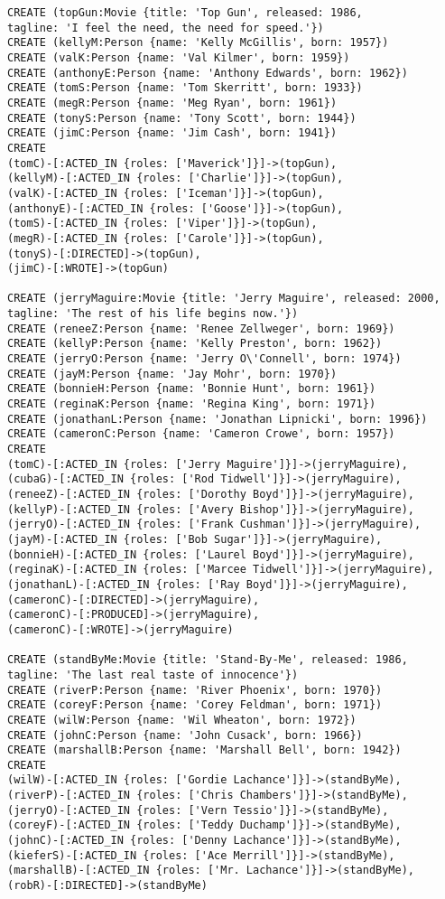 \begin{lstlisting}
CREATE (topGun:Movie {title: 'Top Gun', released: 1986,
tagline: 'I feel the need, the need for speed.'})
CREATE (kellyM:Person {name: 'Kelly McGillis', born: 1957})
CREATE (valK:Person {name: 'Val Kilmer', born: 1959})
CREATE (anthonyE:Person {name: 'Anthony Edwards', born: 1962})
CREATE (tomS:Person {name: 'Tom Skerritt', born: 1933})
CREATE (megR:Person {name: 'Meg Ryan', born: 1961})
CREATE (tonyS:Person {name: 'Tony Scott', born: 1944})
CREATE (jimC:Person {name: 'Jim Cash', born: 1941})
CREATE
(tomC)-[:ACTED_IN {roles: ['Maverick']}]->(topGun),
(kellyM)-[:ACTED_IN {roles: ['Charlie']}]->(topGun),
(valK)-[:ACTED_IN {roles: ['Iceman']}]->(topGun),
(anthonyE)-[:ACTED_IN {roles: ['Goose']}]->(topGun),
(tomS)-[:ACTED_IN {roles: ['Viper']}]->(topGun),
(megR)-[:ACTED_IN {roles: ['Carole']}]->(topGun),
(tonyS)-[:DIRECTED]->(topGun),
(jimC)-[:WROTE]->(topGun)

CREATE (jerryMaguire:Movie {title: 'Jerry Maguire', released: 2000,
tagline: 'The rest of his life begins now.'})
CREATE (reneeZ:Person {name: 'Renee Zellweger', born: 1969})
CREATE (kellyP:Person {name: 'Kelly Preston', born: 1962})
CREATE (jerryO:Person {name: 'Jerry O\'Connell', born: 1974})
CREATE (jayM:Person {name: 'Jay Mohr', born: 1970})
CREATE (bonnieH:Person {name: 'Bonnie Hunt', born: 1961})
CREATE (reginaK:Person {name: 'Regina King', born: 1971})
CREATE (jonathanL:Person {name: 'Jonathan Lipnicki', born: 1996})
CREATE (cameronC:Person {name: 'Cameron Crowe', born: 1957})
CREATE
(tomC)-[:ACTED_IN {roles: ['Jerry Maguire']}]->(jerryMaguire),
(cubaG)-[:ACTED_IN {roles: ['Rod Tidwell']}]->(jerryMaguire),
(reneeZ)-[:ACTED_IN {roles: ['Dorothy Boyd']}]->(jerryMaguire),
(kellyP)-[:ACTED_IN {roles: ['Avery Bishop']}]->(jerryMaguire),
(jerryO)-[:ACTED_IN {roles: ['Frank Cushman']}]->(jerryMaguire),
(jayM)-[:ACTED_IN {roles: ['Bob Sugar']}]->(jerryMaguire),
(bonnieH)-[:ACTED_IN {roles: ['Laurel Boyd']}]->(jerryMaguire),
(reginaK)-[:ACTED_IN {roles: ['Marcee Tidwell']}]->(jerryMaguire),
(jonathanL)-[:ACTED_IN {roles: ['Ray Boyd']}]->(jerryMaguire),
(cameronC)-[:DIRECTED]->(jerryMaguire),
(cameronC)-[:PRODUCED]->(jerryMaguire),
(cameronC)-[:WROTE]->(jerryMaguire)

CREATE (standByMe:Movie {title: 'Stand-By-Me', released: 1986,
tagline: 'The last real taste of innocence'})
CREATE (riverP:Person {name: 'River Phoenix', born: 1970})
CREATE (coreyF:Person {name: 'Corey Feldman', born: 1971})
CREATE (wilW:Person {name: 'Wil Wheaton', born: 1972})
CREATE (johnC:Person {name: 'John Cusack', born: 1966})
CREATE (marshallB:Person {name: 'Marshall Bell', born: 1942})
CREATE
(wilW)-[:ACTED_IN {roles: ['Gordie Lachance']}]->(standByMe),
(riverP)-[:ACTED_IN {roles: ['Chris Chambers']}]->(standByMe),
(jerryO)-[:ACTED_IN {roles: ['Vern Tessio']}]->(standByMe),
(coreyF)-[:ACTED_IN {roles: ['Teddy Duchamp']}]->(standByMe),
(johnC)-[:ACTED_IN {roles: ['Denny Lachance']}]->(standByMe),
(kieferS)-[:ACTED_IN {roles: ['Ace Merrill']}]->(standByMe),
(marshallB)-[:ACTED_IN {roles: ['Mr. Lachance']}]->(standByMe),
(robR)-[:DIRECTED]->(standByMe)


\end{lstlisting}
